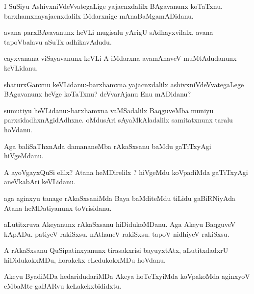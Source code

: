 \documentclass{article}
\begin{document}
\begin{mn}%
I SuSiyu AshivxniVdeVvategaLige yajacnxdalilx BAgavanunx koTaTxnu. barxhamxnayajacnxdalilx 
iMdarxnige mAnaBaMgamADidanu. 
\end{mn}

\begin{mn}%
avana parxBAvavanunx heVLi mugisalu yArigU sAdhayxvilalx. avana tapoVbalavu aSuTx 
adhikavAdudu.
\end{mn}

\begin{mn}%
cayxvanana viSayavanunx keVLi A iMdarxna avamAnaveV muMtAdudanunx keVLidanu.
\end{mn}

\begin{mn}%
shaturxGanxnu keVLidanu:-barxhamxna yajacnxdalilx ashivxniVdeVvategaLege BAgavanunx heVge 
koTaTxnu? deVvarAjanu Enu mADidanu?
\end{mn}

\begin{mn}%
sumutiyu heVLidanu:-barxhamxna vaMSadalilx BaqguveMba muniyu parxsidadhxnAgidAdhxne. 
oMdusAri sAyaMkAladalilx samitatxnunx taralu hoVdanu.
\end{mn}

\begin{mn}%
Aga baliSaThxnAda damananeMba rAkaSxsanu baMdu gaTiTxyAgi hiVgeMdanu.
\end{mn}

\begin{mn}%
A ayoVgayxQuSi elilx? Atana heMDirelilx ? hiVgeMdu koVpadiMda gaTiTxyAgi aneVkabAri 
keVLidanu.
\end{mn}

\begin{mn}%
aga aginxyu tanage rAkaSxsaniMda Baya baMditeMdu tiLidu gaBiRNiyAda Atana heMDatiyanunx 
toVrisidanu.
\end{mn}

\begin{mn}%
aLutitxruva Akeyanunx rAkaSxsanu hiDidukoMDanu. Aga Akeyu BaqguveV kApADu. patiyeV 
rakiSxsu. nAthaneV rakiSxsu. tapoV nidhiyeV rakiSxsu.
\end{mn}

\begin{mn}%
A rAkaSxsanu QuSipatinxyanunx tirasakxrisi bayuyxtAtx, aLutitxdadxrU hiDidukokxMDu, horakekx
eLedukokxMDu hoVdanu.
\end{mn}

\begin{mn}%
Akeyu ByadiMDa  hedaridudariMDa Akeya hoTeTxyiMda koVpakoMda aginxyoV eMbaMte gaBARvu 
keLakekxbididxtu.
\end{mn}
\end{document}
